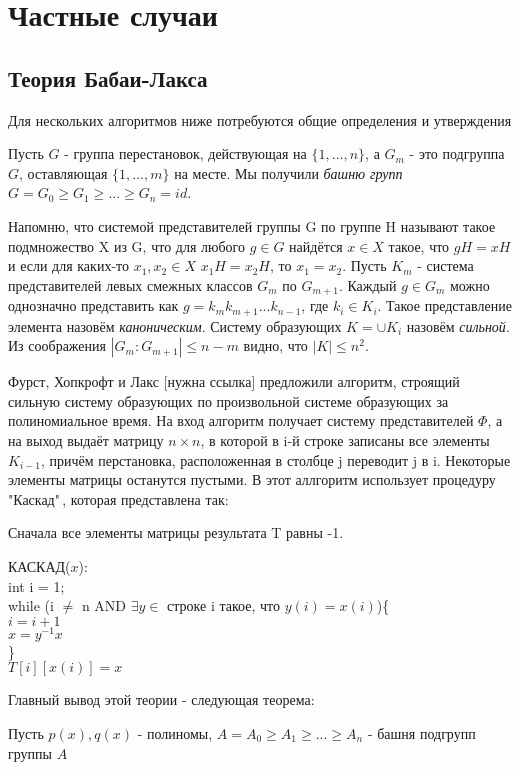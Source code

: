\section{Частные случаи}



\subsection{Теория Бабаи-Лакса}
Для нескольких алгоритмов ниже потребуются общие определения и утверждения

Пусть $G$ - группа перестановок, действующая на $\{1, ..., n\}$, а $G_m$ - это подгруппа $G$, оставляющая $\{1, ..., m\}$ на месте. Мы получили \textit{башню групп} 
$G = G_0 \geqslant G_1 \geqslant ... \geqslant G_n = id$.

Напомню, что системой представителей группы G по группе H называют такое подмножество X из G, что для любого $g \in G$ найдётся $x \in X$ такое, что $gH = xH$ и если для каких-то $x_1, x_2 \in X$ $x_1H = x_2H$, то  $x_1 = x_2$. Пусть $K_m$ - система представителей левых смежных классов $G_m$ по $G_{m+1}$. Каждый $g \in G_m$ можно однозначно представить как $g = k_m k_{m + 1} ... k_{n - 1}$, где $k_i \in K_i$. Такое представление элемента назовём \textit{каноническим}. Систему образующих $K = \cup K_i$ назовём \textit{сильной}. Из соображения $|G_m : G_{m + 1}| \leqslant n - m$ видно, что $|K| \leqslant n^2$. 

Фурст, Хопкрофт и Лакс [нужна ссылка] предложили алгоритм, строящий сильную систему образующих по произвольной системе образующих за полиномиальное время. На вход алгоритм получает систему представителей $\Phi$, а на выход выдаёт матрицу $n \times n$, в которой в i-й строке записаны все элементы $K_{i-1}$, причём перстановка, расположенная в столбце j переводит j в i. Некоторые элементы матрицы останутся пустыми.
В \cite{11} этот аллгоритм использует процедуру "Каскад"\,, которая представлена так:

Сначала все элементы матрицы результата T равны -1.

КАСКАД($x$):\\
int i = 1;\\
while (i $\neq$ n AND $\exists y \in$ строке i такое, что $y(i) = x(i)$)\{\\
$i = i + 1$\\
$x = y^{-1}x$\\
\}\\
$T[i][x(i)] = x$



Главный вывод этой теории - следующая теорема:

\begin{theorem}
    Пусть $p(x), q(x)$ - полиномы, $A = A_0 \geqslant A_1 \geqslant ... \geqslant A_n$ - башня подгрупп группы $A$
\end{theorem}





